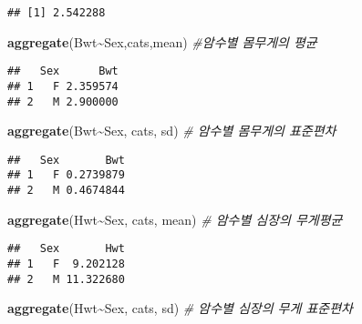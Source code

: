 \documentclass[
]{article}
\newenvironment{Shaded}{\begin{snugshade}}{\end{snugshade}}
\newcommand{\CommentTok}[1]{\textcolor[rgb]{0.56,0.35,0.01}{\textit{#1}}}
\newcommand{\FunctionTok}[1]{\textcolor[rgb]{0.13,0.29,0.53}{\textbf{#1}}}
\newcommand{\NormalTok}[1]{#1}
\newcommand{\SpecialCharTok}[1]{\textcolor[rgb]{0.81,0.36,0.00}{\textbf{#1}}}
\begin{document}
\begin{Shaded}
\end{Shaded}

\begin{verbatim}
## [1] 2.542288
\end{verbatim}

\begin{Shaded}
\begin{Highlighting}[]
\FunctionTok{aggregate}\NormalTok{(Bwt}\SpecialCharTok{\textasciitilde{}}\NormalTok{Sex,cats,mean) }\CommentTok{\#암수별 몸무게의 평균}
\end{Highlighting}
\end{Shaded}

\begin{verbatim}
##   Sex      Bwt
## 1   F 2.359574
## 2   M 2.900000
\end{verbatim}

\begin{Shaded}
\begin{Highlighting}[]
\FunctionTok{aggregate}\NormalTok{(Bwt}\SpecialCharTok{\textasciitilde{}}\NormalTok{Sex, cats, sd)      }\CommentTok{\# 암수별 몸무게의 표준편차}
\end{Highlighting}
\end{Shaded}

\begin{verbatim}
##   Sex       Bwt
## 1   F 0.2739879
## 2   M 0.4674844
\end{verbatim}

\begin{Shaded}
\begin{Highlighting}[]
\FunctionTok{aggregate}\NormalTok{(Hwt}\SpecialCharTok{\textasciitilde{}}\NormalTok{Sex, cats, mean)    }\CommentTok{\# 암수별 심장의 무게평균}
\end{Highlighting}
\end{Shaded}

\begin{verbatim}
##   Sex       Hwt
## 1   F  9.202128
## 2   M 11.322680
\end{verbatim}

\begin{Shaded}
\begin{Highlighting}[]
\FunctionTok{aggregate}\NormalTok{(Hwt}\SpecialCharTok{\textasciitilde{}}\NormalTok{Sex, cats, sd)      }\CommentTok{\# 암수별 심장의 무게 표준편차}
\end{Highlighting}
\end{Shaded}
\end{document}
